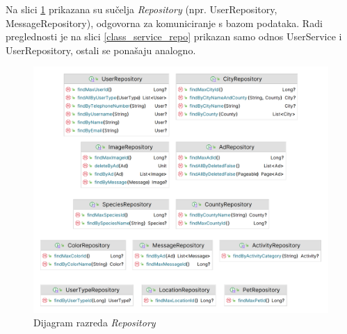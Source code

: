 			Na slici \ref{class_repo} prikazana su sučelja \textit{Repository} (npr. UserRepository, MessageRepository), odgovorna za komuniciranje s bazom podataka. Radi preglednosti je na slici \ref{class_service_repo} prikazan samo odnos UserService i UserRepository, ostali se ponašaju analogno.
			
			\begin{figure}[H]
				\includegraphics[scale=0.25]{slike/class_repo.PNG} 
				\centering
				\caption{Dijagram razreda \textit{Repository}}
				\label{class_repo}
			\end{figure}
			

